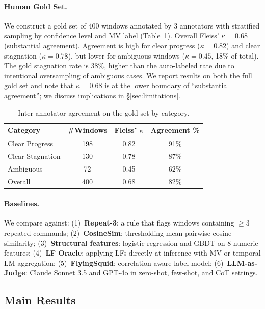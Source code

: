 \documentclass[11pt]{article}
\begin{document}
\paragraph{Human Gold Set.}
\label{sec:gold_set}
We construct a gold set of 400 windows annotated by 3 annotators with stratified sampling by confidence level and MV label (Table~\ref{tab:annotation}).
Overall Fleiss' $\kappa = 0.68$ (substantial agreement).
Agreement is high for clear progress ($\kappa = 0.82$) and clear stagnation ($\kappa = 0.78$), but lower for ambiguous windows ($\kappa = 0.45$, 18\% of total).
The gold stagnation rate is 38\%, higher than the auto-labeled rate due to intentional oversampling of ambiguous cases.
We report results on both the full gold set and note that $\kappa = 0.68$ is at the lower boundary of ``substantial agreement''; we discuss implications in \S\ref{sec:limitations}.

\begin{table}[t]
\centering
\caption{Inter-annotator agreement on the gold set by category.}
\label{tab:annotation}
\small
\begin{tabular}{lccc}
\toprule
Category & \#Windows & Fleiss' $\kappa$ & Agreement \% \\
\midrule
Clear Progress & 198 & 0.82 & 91\% \\
Clear Stagnation & 130 & 0.78 & 87\% \\
Ambiguous & 72 & 0.45 & 62\% \\
\midrule
Overall & 400 & 0.68 & 82\% \\
\bottomrule
\end{tabular}
\end{table}

\paragraph{Baselines.}
We compare against: (1)~\textbf{Repeat-3}: a rule that flags windows containing $\geq$3 repeated commands; (2)~\textbf{CosineSim}: thresholding mean pairwise cosine similarity; (3)~\textbf{Structural features}: logistic regression and GBDT on 8 numeric features; (4)~\textbf{LF Oracle}: applying LFs directly at inference with MV or temporal LM aggregation; (5)~\textbf{FlyingSquid}: correlation-aware label model; (6)~\textbf{LLM-as-Judge}: Claude Sonnet 3.5 and GPT-4o in zero-shot, few-shot, and CoT settings.

\subsection{Main Results}
\label{sec:main_results}
\end{document}
